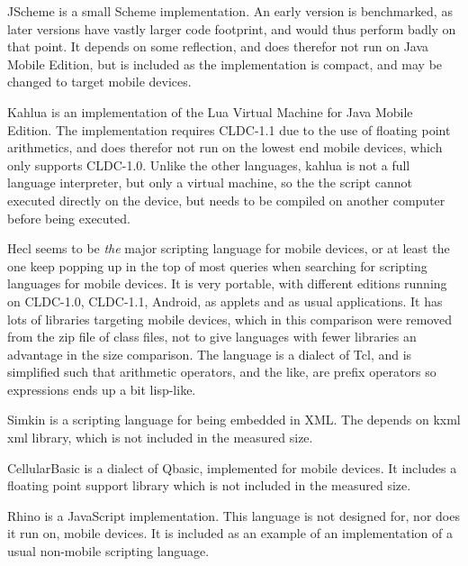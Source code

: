 \documentclass[11pt]{report}
\begin{document}
JScheme\cite{jscheme} is a small Scheme implementation. An early version is benchmarked, as later versions have vastly larger code footprint, and would thus perform badly on that point. It depends on some reflection, and does therefor not run on Java Mobile Edition, but is included as the implementation is compact, and may be changed to target mobile devices.

Kahlua\cite{kahlua} is an implementation of the Lua Virtual Machine for Java Mobile Edition. 
The implementation requires CLDC-1.1 due to the use of floating point arithmetics, and does therefor not run on the lowest end mobile devices, which only supports CLDC-1.0.
Unlike the other languages, kahlua is not a full language interpreter, but only a virtual machine, so the the script cannot executed directly on the device, but needs to be compiled on another computer before being executed.

Hecl\cite{hecl} seems to be \emph{the} major scripting language for mobile devices, or at least the one keep popping up in the top of most queries when searching for scripting languages for mobile devices.
It is very portable, with different editions running on CLDC-1.0, CLDC-1.1, Android, as applets and as usual applications.
It has lots of libraries targeting mobile devices, which in this comparison were removed from the zip file of class files, not to give languages with fewer libraries an advantage in the size comparison.
The language is a dialect of Tcl, and is simplified such that arithmetic operators, and the like, are prefix operators so expressions ends up a bit lisp-like.

Simkin\cite{simkin} is a scripting language for being embedded in XML. The depends on kxml xml library, which is not included in the measured size. 

CellularBasic\cite{cellularbasic} is a dialect of Qbasic, implemented for mobile devices. 
It includes a floating point support library which is not included in the measured size. 

Rhino\cite{rhino} is a JavaScript implementation. This language is not designed for, nor does it run on, mobile devices. It is included as an example of an implementation of a usual non-mobile scripting language.
\end{document}
